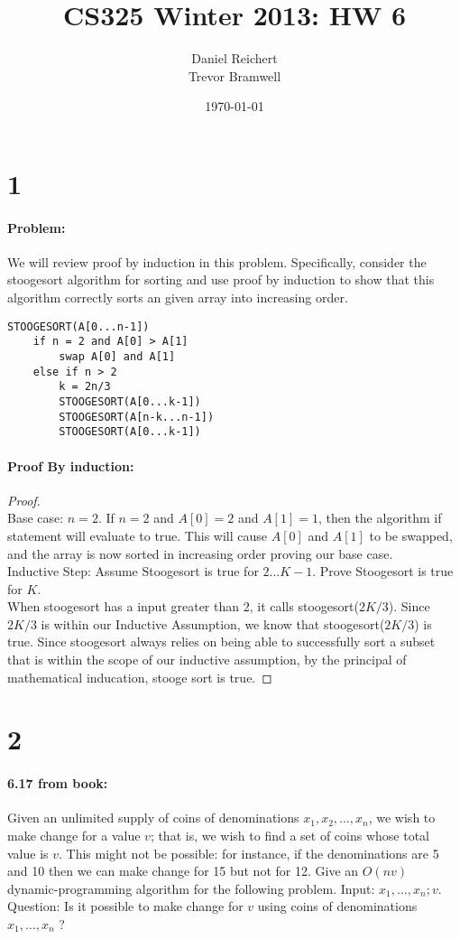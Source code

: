 \documentclass[12pt]{article}
\title{CS325 Winter 2013: HW 6}
\author{
    Daniel Reichert \\
    Trevor Bramwell \\
}
\date{\today}
\newcommand{\BigO}[1]{\ensuremath{O(#1)}}
\begin{document}
\maketitle
\section*{1}
\paragraph{Problem:}
We will review proof by induction in this problem. Specifically, consider the
stoogesort algorithm for sorting and use proof by induction to show that this
algorithm correctly sorts an given array into increasing order.
\begin{lstlisting}[mathescape]
STOOGESORT(A[0...n-1])
    if n = 2 and A[0] > A[1]
        swap A[0] and A[1]
    else if n > 2
        k = 2n/3
        STOOGESORT(A[0...k-1])
        STOOGESORT(A[n-k...n-1])
        STOOGESORT(A[0...k-1])
\end{lstlisting}
\paragraph{Proof By induction:}
\begin{proof}
\\Base case: $n = 2$.
If $n=2$ and $A[0] = 2$ and $A[1] = 1$, then the algorithm if statement
will evaluate to true.  This will cause $A[0]$ and $A[1]$ to be swapped,
and the array is now sorted in increasing order proving our base case.
\\
Inductive Step:
Assume Stoogesort is true for $2...K-1$.
Prove Stoogesort is true for $K$.
\\
When stoogesort has a input greater than 2, it calls stoogesort($2K/3$).
Since $2K/3$ is within our Inductive Assumption, we know that
stoogesort($2K/3$) is true.  Since stoogesort always relies on being
able to successfully sort a subset that is within the scope of our
inductive assumption, by the principal of mathematical inducation,
stooge sort is true.
\end{proof}

\section*{2}
\paragraph{6.17 from book:}
Given an unlimited supply of coins of denominations $x_1 , x_2 , \dots ,
x_n$, we wish to make change for a value $v$; that is, we wish to find a
set of coins whose total value is $v$. This might not be possible: for
instance, if the denominations are 5 and 10 then we can make change for
15 but not for 12.  Give an $\BigO{nv}$ dynamic-programming algorithm
for the following problem.  Input: $x_1 , \dots , x_n ; v$.  Question:
Is it possible to make change for $v$ using coins of denominations $x_1
, \dots , x_n$ ?
\end{document}
